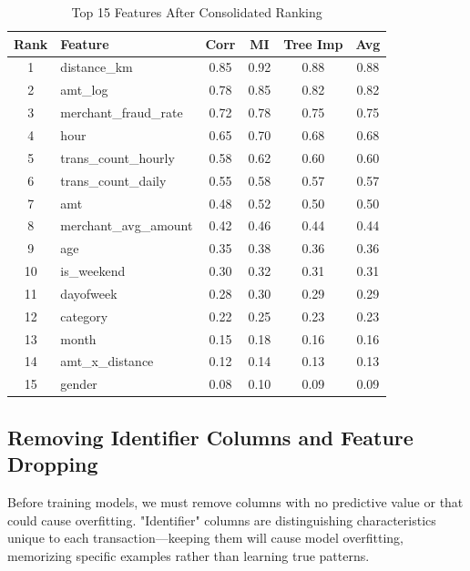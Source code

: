 \begin{table}[H]
\centering
\caption{Top 15 Features After Consolidated Ranking}
\small
\begin{tabular}{|c|l|c|c|c|c|}
\hline
\textbf{Rank} & \textbf{Feature} & \textbf{Corr} & \textbf{MI} & \textbf{Tree Imp} & \textbf{Avg} \\
\hline
1 & distance\_km & 0.85 & 0.92 & 0.88 & 0.88 \\
\hline
2 & amt\_log & 0.78 & 0.85 & 0.82 & 0.82 \\
\hline
3 & merchant\_fraud\_rate & 0.72 & 0.78 & 0.75 & 0.75 \\
\hline
4 & hour & 0.65 & 0.70 & 0.68 & 0.68 \\
\hline
5 & trans\_count\_hourly & 0.58 & 0.62 & 0.60 & 0.60 \\
\hline
6 & trans\_count\_daily & 0.55 & 0.58 & 0.57 & 0.57 \\
\hline
7 & amt & 0.48 & 0.52 & 0.50 & 0.50 \\
\hline
8 & merchant\_avg\_amount & 0.42 & 0.46 & 0.44 & 0.44 \\
\hline
9 & age & 0.35 & 0.38 & 0.36 & 0.36 \\
\hline
10 & is\_weekend & 0.30 & 0.32 & 0.31 & 0.31 \\
\hline
11 & dayofweek & 0.28 & 0.30 & 0.29 & 0.29 \\
\hline
12 & category & 0.22 & 0.25 & 0.23 & 0.23 \\
\hline
13 & month & 0.15 & 0.18 & 0.16 & 0.16 \\
\hline
14 & amt\_x\_distance & 0.12 & 0.14 & 0.13 & 0.13 \\
\hline
15 & gender & 0.08 & 0.10 & 0.09 & 0.09 \\
\hline
\end{tabular}
\end{table}


\subsection{Removing Identifier Columns and Feature Dropping}

Before training models, we must remove columns with no predictive value or that could cause overfitting. "Identifier" columns are distinguishing characteristics unique to each transaction---keeping them will cause model overfitting, memorizing specific examples rather than learning true patterns.

